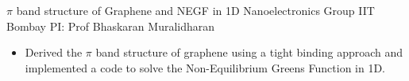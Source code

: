 
        {$\pi$ band structure of Graphene and NEGF in 1D}
        {\newline Nanoelectronics Group}
        {IIT Bombay}
        {PI: Prof Bhaskaran Muralidharan}{
    \begin{itemize}
        \item Derived the $\pi$ band structure of graphene using a tight binding approach and implemented a code to solve the Non-Equilibrium Green\textquotesingle s Function in 1D.
    \end{itemize}
}
